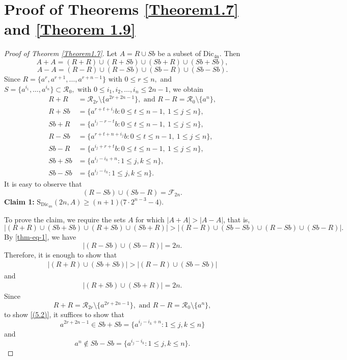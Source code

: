 \documentclass[11pt,reqno]{amsart}
\numberwithin{equation}{section}
\begin{document}
\section{Proof of Theorems \ref{Theorem1.7} and \ref{Theorem 1.9}}\label{section-5}
\begin{proof}[Proof of Theorem \ref{Theorem1.7}]
Let $A=R \cup Sb$ be a subset of $\mathrm{Dic_{4n}}$. Then 
$$A+A=(R+R)\cup (R+Sb)\cup (Sb+R)\cup (Sb+Sb),$$
$$A-A=(R-R)\cup (R-Sb)\cup (Sb-R)\cup (Sb-Sb).$$
Since  $R=\{a^{r},a^{r+1},\ldots,a^{r+n-1}\} \text{ with } 0\leq r\leq n,$  and $S=\{a^{i_1},\ldots, a^{i_n}\}\subset \mathcal{R}_0, \text{ with } 0\leq i_1,i_2,\ldots, i_n\leq 2n-1$, we obtain   
\begin{align*}
R+R&=\mathcal{R}_{2r}\setminus\{a^{2r+2n-1}\}, \text{ and } R-R=\mathcal{R}_0\setminus\{a^{n}\},
\\
R+Sb&=\{a^{r+t+i_j}b:0\leq t\leq n-1,\ 1\leq j\leq n\},\\
Sb+R&=\{a^{i_j-r-t}b:0\leq t\leq n-1,\ 1\leq j\leq n\},
\\
R-Sb&=\{a^{r+t+n+i_j}b:0\leq t\leq n-1,\ 1\leq j\leq n\},
\\
Sb-R&=\{a^{i_j+r+t}b:0\leq t\leq n-1,\ 1\leq j\leq n\},
\\
Sb+Sb&=\{a^{i_j-i_k+n}:1\leq j,k\leq n\},
\\
Sb-Sb&=\{a^{i_j-i_k}:1\leq j,k\leq n\}.
\end{align*}
It is easy to observe that 
\begin{equation}\label{thm-eq-1}
    (R-Sb)\cup (Sb-R)=\mathcal{F}_{2n}.
\end{equation}
\noindent\textbf{Claim 1:} $\mathrm{S}_{\mathrm{Dic}_{4n}}(2n,A)\geq (n+1)\bigl(7\cdot 2^{n-3}-4\bigr).$\par
To prove the claim, we require the sets $A$ for which $|A+A|>|A-A|$, that is, $$|(R+R)\cup (Sb+Sb)\cup (R+Sb)\cup (Sb+R)|>|(R-R)\cup (Sb-Sb)\cup (R-Sb)\cup (Sb-R)|.$$ By \eqref{thm-eq-1}, we have $$  |(R-Sb)\cup (Sb-R)|=2n.$$ Therefore, it is enough to show that
\begin{align}\label{(5.2)}
 |(R+R)\cup (Sb+Sb)|>|(R-R)\cup (Sb-Sb)|   
\end{align}
and 
\begin{align}\label{(5.3)}
|(R+Sb)\cup (Sb+R)|=2n.    
\end{align}
Since $$R+R=\mathcal{R}_{2r}\setminus\{a^{2r+2n-1}\}, \text{ and } R-R=\mathcal{R}_0\setminus\{a^{n}\},$$ 
to show \eqref{(5.2)}, it suffices to show that
$$ a^{2r+2n-1}\in Sb+Sb=\{a^{i_j-i_k+n}:1\leq j,k\leq n\}$$ and $$a^{n}\notin Sb-Sb=\{a^{i_j-i_k}:1\leq j,k\leq n\}.$$

\end{proof}
\end{document}
